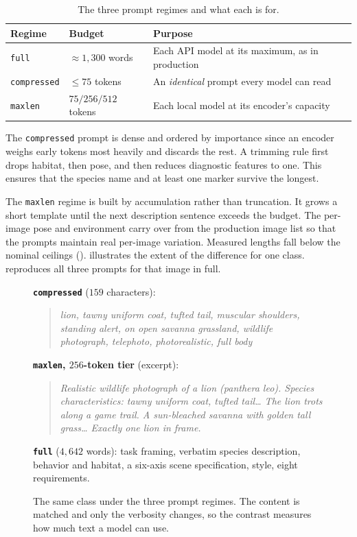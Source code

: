 \begin{table}[htbp]
\centering
\caption{The three prompt regimes and what each is for.}
\label{tab:generator-prompt-regimes}
\begin{tabularx}{\textwidth}{@{}llX@{}}
\toprule
Regime & Budget & Purpose \\
\midrule
\texttt{full} & $\approx 1{,}300$ words & Each API model at its maximum, as in production \\
\texttt{compressed} & $\leq 75$ tokens & An \emph{identical} prompt every model can read \\
\texttt{maxlen} & $75/256/512$ tokens & Each local model at its encoder's capacity \\
\bottomrule
\end{tabularx}
\end{table}

The \texttt{compressed} prompt is dense and ordered by importance since an encoder weighs early tokens most heavily and discards the rest. A trimming rule first drops habitat, then pose, and then reduces diagnostic features to one. This ensures that the species name and at least one marker survive the longest.

The \texttt{maxlen} regime is built by accumulation rather than truncation. It grows a short template until the next description sentence exceeds the budget. The per-image pose and environment carry over from the production image list so that the prompts maintain real per-image variation. Measured lengths fall below the nominal ceilings ().  illustrates the extent of the difference for one class.  reproduces all three prompts for that image in full.

\begin{figure}[htbp]
\centering
\begin{minipage}{0.95\textwidth}
\small
\textbf{\texttt{compressed}} ($159$ characters):
\begin{quote}\itshape
lion, tawny uniform coat, tufted tail, muscular shoulders, standing alert, on open savanna grassland, wildlife photograph, telephoto, photorealistic, full body
\end{quote}
\textbf{\texttt{maxlen}, $256$-token tier} (excerpt):
\begin{quote}\itshape
Realistic wildlife photograph of a lion (panthera leo). Species characteristics: tawny uniform coat, tufted tail\ldots{} The lion trots along a game trail. A sun-bleached savanna with golden tall grass\ldots{} Exactly one lion in frame.
\end{quote}
\textbf{\texttt{full}} ($4{,}642$ words): task framing, verbatim species description, behavior and habitat, a six-axis scene specification, style, eight requirements.
\end{minipage}
\caption[The same class under the three prompt regimes]{The same class under the three prompt regimes. The content is matched and only the verbosity changes, so the contrast measures how much text a model can use.}
\label{fig:prompt-regime-example}
\end{figure}

